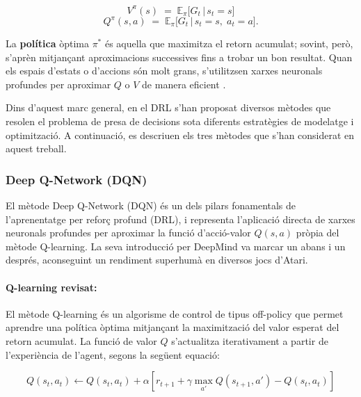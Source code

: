 \documentclass[12pt,a4paper,twoside]{book}
\begin{document}
\begin{equation}
V^\pi(s) \;=\; \mathbb{E}_\pi\bigl[G_t \,\big\vert\, s_t = s\bigr]
\end{equation}
\begin{equation}
Q^\pi(s,a) \;=\; \mathbb{E}_\pi\bigl[G_t \,\big\vert\, s_t = s,\; a_t = a\bigr].
\end{equation}

La \textbf{política} òptima $\pi^*$ és aquella que maximitza el retorn acumulat; sovint, però, s'aprèn mitjançant aproximacions successives fins a trobar un bon resultat. Quan els espais d'estats o d'accions són molt grans, s'utilitzsen xarxes neuronals profundes per aproximar $Q$ o $V$ de manera eficient \cite{MnihNature2015}.

\vspace{2ex}
Dins d'aquest marc general, en el DRL s'han proposat diversos mètodes que resolen el problema de presa de decisions sota diferents estratègies de modelatge i optimització. A continuació, es descriuen els tres mètodes que s'han considerat en aquest treball.

\subsubsection{Deep Q-Network (DQN)}

El mètode Deep Q-Network (DQN) és un dels pilars fonamentals de l'aprenentatge per reforç profund (DRL), i representa l'aplicació directa de xarxes neuronals profundes per aproximar la funció d'acció-valor $Q(s, a)$ pròpia del mètode Q-learning. La seva introducció per DeepMind \cite{MnihNature2015} va marcar un abans i un després, aconseguint un rendiment superhumà en diversos jocs d'Atari.

\paragraph{Q-learning revisat:}


El mètode Q-learning és un algorisme de control de tipus off-policy que permet aprendre una política òptima mitjançant la maximització del valor esperat del retorn acumulat. La funció de valor $Q$ s’actualitza iterativament a partir de l’experiència de l’agent, segons la següent equació:

\begin{equation}
Q(s_t, a_t) \leftarrow Q(s_t, a_t) + \alpha \left[ r_{t+1} + \gamma \max_{a'} Q(s_{t+1}, a') - Q(s_t, a_t) \right]
\end{equation}
\end{document}
